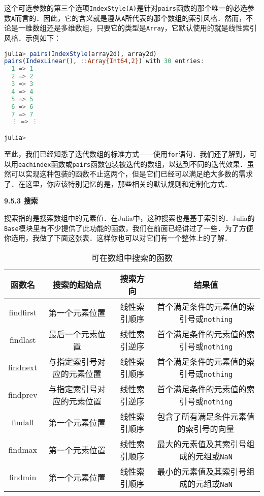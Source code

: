 这个可选参数的第三个选项\verb|IndexStyle(A)|是针对\verb|pairs|函数的那个唯一的必选参数\verb|A|而言的．因此，它的含义就是遵从\verb|A|所代表的那个数组的索引风格．然而，不论是一维数组还是多维数组，只要它的类型是\verb|Array|，它默认使用的就是线性索引风格．示例如下：

\begin{lstlisting}[language=julia]
julia> pairs(IndexStyle(array2d), array2d)
pairs(IndexLinear(), ::Array{Int64,2}) with 30 entries:
  1 => 1
  2 => 2
  3 => 3
  4 => 4
  5 => 5
  6 => 6
  7 => 7
  ⋮ => ⋮

julia> 
\end{lstlisting}

至此，我们已经知悉了迭代数组的标准方式——使用\verb|for|语句．我们还了解到，可以用\verb|eachindex|函数或\verb|pairs|函数包装被迭代的数组，以达到不同的迭代效果．虽然可以实现这种包装的函数不止这两个，但是它们已经可以满足绝大多数的需求了．在这里，你应该特别记忆的是，那些相关的默认规则和定制化方式．

\textbf{9.5.3 搜索}

搜索指的是搜索数组中的元素值．在Julia中，这种搜索也是基于索引的．Julia的\verb|Base|模块里有不少提供了此功能的函数，我们在前面已经讲过了一些．为了方便你选用，我做了下面这张表．这样你也可以对它们有一个整体上的了解．

\begin{table}[ht]
\centering
\caption{可在数组中搜索的函数}\label{JuC9S5_tab1}
\begin{tabular}{|c|c|c|c|}
\hline
 函数名     & 搜索的起始点             & 搜索方向     & 结果值 \\
\hline
 findfirst & 第一个元素位置           & 线性索引顺序 & 首个满足条件的元素值的索引号或\verb|nothing| \\
\hline
 findlast  & 最后一个元素位置         & 线性索引逆序 & 首个满足条件的元素值的索引号或\verb|nothing| \\
\hline
 findnext  & 与指定索引号对应的元素位置 & 线性索引顺序 & 首个满足条件的元素值的索引号或\verb|nothing| \\
\hline
 findprev  & 与指定索引号对应的元素位置 & 线性索引逆序 & 首个满足条件的元素值的索引号或\verb|nothing| \\
\hline
 findall   & 第一个元素位置           & 线性索引顺序 & 包含了所有满足条件元素值的索引号的向量  \\
\hline
 findmax   & 第一个元素位置           & 线性索引顺序 & 最大的元素值及其索引号组成的元组或\verb|NaN| \\
\hline
 findmin   & 第一个元素位置           & 线性索引顺序 & 最小的元素值及其索引号组成的元组或\verb|NaN| \\
\hline
\end{tabular}
\end{table}

